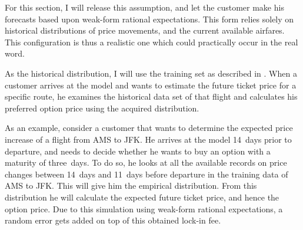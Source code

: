 For this section, I will release this assumption, and let the customer make his forecasts based upon weak-form rational expectations. This form relies solely on historical distributions of price movements, and the current available airfares. This configuration is thus a realistic one which could practically occur in the real word.

As the historical distribution, I will use the training set as described in . When a customer arrives at the model and wants to estimate the future ticket price for a specific route, he examines the historical data set of that flight and calculates his preferred option price using the acquired distribution.

As an example, consider a customer that wants to determine the expected price increase of a flight from AMS to JFK. He arrives at the model 14~days prior to departure, and needs to decide whether he wants to buy an option with a maturity of three~days. To do so, he looks at all the available records on price changes between 14~days and 11~days before departure in the training data of AMS to JFK. This will give him the empirical distribution. From this distribution he will calculate the expected future ticket price, and hence the option price. Due to this simulation using weak-form rational expectations, a random error gets added on top of this obtained lock-in fee.


